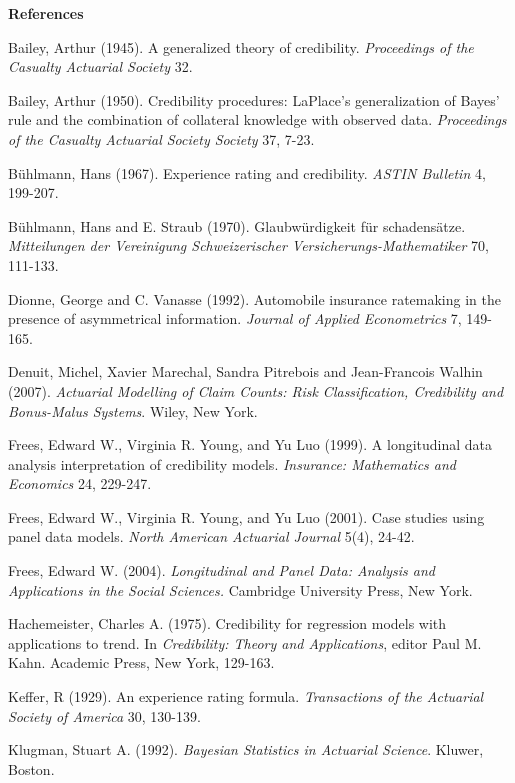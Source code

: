 \bigskip

\textbf{References}



\begin{multicols}{2}


Bailey, Arthur (1945). A generalized theory of credibility.
\textit{Proceedings of the Casualty Actuarial Society} 32.

Bailey, Arthur (1950). Credibility procedures: LaPlace's
generalization of Bayes' rule and the combination of collateral
knowledge with observed data. \textit{Proceedings of the Casualty
Actuarial Society Society} 37, 7-23.

B\"{u}hlmann, Hans (1967). Experience rating and credibility.
\emph{ASTIN Bulletin} 4, 199-207.

B\"{u}hlmann, Hans and E. Straub (1970). Glaubw\"{u}rdigkeit f\"{u}r
schadens\"{a}tze. \emph{Mitteilungen der Vereinigung Schweizerischer
Versicherungs-Mathematiker} 70, 111-133.

Dionne, George and C. Vanasse (1992). Automobile insurance
ratemaking in the presence of asymmetrical information.
\textit{Journal of Applied Econometrics} 7, 149-165.

Denuit, Michel, Xavier Marechal, Sandra Pitrebois and Jean-Francois
Walhin (2007). \textit{Actuarial Modelling of Claim Counts: Risk
Classification, Credibility and Bonus-Malus Systems}. Wiley, New
York.

Frees, Edward W., Virginia R. Young, and Yu Luo (1999). A
longitudinal data analysis interpretation of credibility models.
\emph{Insurance: Mathematics and Economics} 24, 229-247.

Frees, Edward W., Virginia R. Young, and Yu Luo (2001). Case studies
using panel data models. \emph{North American Actuarial Journal}
5(4), 24-42.

Frees, Edward W. (2004). \textit{Longitudinal and Panel Data:
Analysis and Applications in the Social Sciences.} Cambridge
University Press, New York.

Hachemeister, Charles A. (1975). Credibility for regression models
with applications to trend. In \emph{Credibility: Theory and
Applications}, editor Paul M. Kahn. Academic Press, New York,
129-163.

Keffer, R (1929). An experience rating formula. \textit{Transactions
of the Actuarial Society of America} 30, 130-139.

Klugman, Stuart A. (1992). \emph{Bayesian Statistics in Actuarial
Science}. Kluwer, Boston.


\end{multicols}
